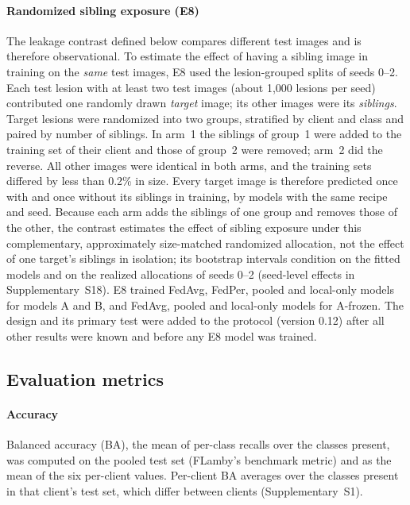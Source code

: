 \paragraph{Randomized sibling exposure (E8)} The leakage contrast defined below compares different test
images and is therefore observational. To estimate the effect of having a sibling image in training on
the \emph{same} test images, E8 used the lesion-grouped splits of seeds 0--2. Each test lesion with at
least two test images (about 1,000 lesions per seed) contributed one randomly drawn \emph{target} image;
its other images were its \emph{siblings}. Target lesions were randomized into two groups, stratified by
client and class and paired by number of siblings. In arm~1 the siblings of group~1 were added to the
training set of their client and those of group~2 were removed; arm~2 did the reverse. All other images
were identical in both arms, and the training sets differed by less than 0.2\% in size. Every target image
is therefore predicted once with and once without its siblings in training, by models with the same recipe and seed. Because each arm adds the siblings of one group and removes those of the other, the contrast estimates the effect of sibling exposure under this complementary, approximately size-matched randomized allocation, not the effect of one target's siblings in isolation; its bootstrap intervals condition on the fitted models and on the realized allocations of seeds 0--2 (seed-level effects in Supplementary~S18). E8 trained FedAvg, FedPer, pooled and local-only models for models A and B, and FedAvg,
pooled and local-only models for A-frozen. The design and its primary test were added to the protocol
(version 0.12) after all other results were known and before any E8 model was trained.

\subsection{Evaluation metrics}
\label{sec:metrics}

\paragraph{Accuracy} Balanced accuracy (BA), the mean of per-class recalls over the classes present, was
computed on the pooled test set (FLamby's benchmark metric) and as the mean of the six per-client values.
Per-client BA averages over the classes present in that client's test set, which differ between clients
(Supplementary~S1).


